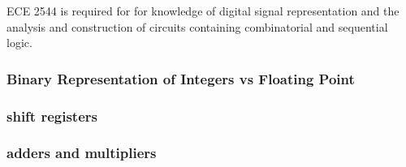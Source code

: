 ECE 2544 is required for for knowledge of digital signal representation and the analysis and construction of circuits containing combinatorial and sequential logic.

\subsubsection*{Binary Representation of Integers vs Floating Point}

\subsubsection*{shift registers}

\subsubsection*{adders and multipliers}

